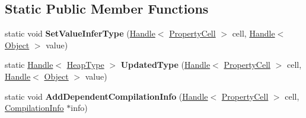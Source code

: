 \subsection*{Static Public Member Functions}
\begin{DoxyCompactItemize}
\item 
\hypertarget{classv8_1_1internal_1_1_property_cell_a8a7327853adc8578d1cf6ed71af143b0}{}static void {\bfseries Set\+Value\+Infer\+Type} (\hyperlink{classv8_1_1internal_1_1_handle}{Handle}$<$ \hyperlink{classv8_1_1internal_1_1_property_cell}{Property\+Cell} $>$ cell, \hyperlink{classv8_1_1internal_1_1_handle}{Handle}$<$ \hyperlink{classv8_1_1internal_1_1_object}{Object} $>$ value)\label{classv8_1_1internal_1_1_property_cell_a8a7327853adc8578d1cf6ed71af143b0}

\item 
\hypertarget{classv8_1_1internal_1_1_property_cell_a05882633175da30c98efd2b47c4db602}{}static \hyperlink{classv8_1_1internal_1_1_handle}{Handle}$<$ \hyperlink{classv8_1_1internal_1_1_type_impl}{Heap\+Type} $>$ {\bfseries Updated\+Type} (\hyperlink{classv8_1_1internal_1_1_handle}{Handle}$<$ \hyperlink{classv8_1_1internal_1_1_property_cell}{Property\+Cell} $>$ cell, \hyperlink{classv8_1_1internal_1_1_handle}{Handle}$<$ \hyperlink{classv8_1_1internal_1_1_object}{Object} $>$ value)\label{classv8_1_1internal_1_1_property_cell_a05882633175da30c98efd2b47c4db602}

\item 
\hypertarget{classv8_1_1internal_1_1_property_cell_afa7f9f21b69187b579175e0d785be3cd}{}static void {\bfseries Add\+Dependent\+Compilation\+Info} (\hyperlink{classv8_1_1internal_1_1_handle}{Handle}$<$ \hyperlink{classv8_1_1internal_1_1_property_cell}{Property\+Cell} $>$ cell, \hyperlink{classv8_1_1internal_1_1_compilation_info}{Compilation\+Info} $\ast$info)\label{classv8_1_1internal_1_1_property_cell_afa7f9f21b69187b579175e0d785be3cd}

\end{DoxyCompactItemize}
